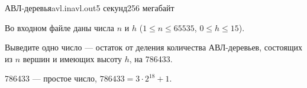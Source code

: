 \begin{problem}{АВЛ-деревья}{avl.in}{avl.out}{5 секунд}{256 мегабайт}
\InputFile

Во входном файле даны числа $n$ и $h$ ($1 \le n \le 65535$,
$0 \le h \le 15$).

\OutputFile

Выведите одно число --- остаток от деления количества АВЛ-деревьев,
состоящих из $n$ вершин и имеющих высоту $h$, на 786433.

\Example

\begin{example}
%
\end{example}
\bigskip

\Note

786433 --- простое число, $786433 = 3 \cdot 2^{18} + 1$.

\end{problem}

